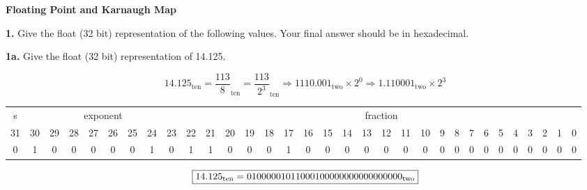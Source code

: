 \documentclass[fleqn]{article}
\begin{document}
\pagestyle{fancy}
\fancyhead{}
\fancyhead[R]{\thepage}
\fancyfoot{}

\begin{center}
    \Large{\textbf{Floating Point and Karnaugh Map}}\\
\end{center}
\vspace{0.25in}

\textbf{1.} Give the float (32 bit) representation
of the following values. Your final answer should be in hexadecimal. 

\vspace{5mm}

\textbf{1a.} Give the float (32 bit) representation of 14.125.
\begin{addmargin}[0.15cm]{0cm}
\[14.125_{\text{ten}} = \frac{113}{8}_{\text{ten}} = \frac{113}{2^3}_{\text{ten}} \Rightarrow 1110.001_{\text{two}} \times 2^0 \Rightarrow 1.110001_{\text{two}} \times 2^3 \]
\begin{table}[H]
    \setlength{\tabcolsep}{4pt}
    \fontsize{7pt}{8pt}\selectfont
    \begin{tabular}{c|cccccccc|ccccccccccccccccccccccc}
        s & \multicolumn{8}{c|}{exponent} & \multicolumn{23}{c}{fraction} \\
        31 & 30 & 29 & 28 & 27 & 26 & 25 & 24 & 23 & 22 & 21 & 20 & 19 & 18 & 17 & 16 & 15 & 14 & 13 & 12 & 11 & 10 & 9 & 8 & 7 & 6 & 5 & 4 & 3 & 2 & 1 & 0 \\
        0  & 1  & 0  & 0  &  0 &  0 &  0 &  1 &  0 &  1 & 1 & 0 & 0 & 0 & 1 & 0 & 0 & 0 & 0 & 0 & 0 & 0 & 0 & 0 & 0 & 0 & 0 & 0 & 0 & 0 & 0 & 0
    \end{tabular}
\end{table}
\vspace{-0.25in}
\[ \boxed{ 14.125\textsubscript{ten} = 0100 0001 0110 0010 0000 0000 0000 0000\textsubscript{two} } \]
\end{addmargin}
\vspace{0.5in}
\end{document}

